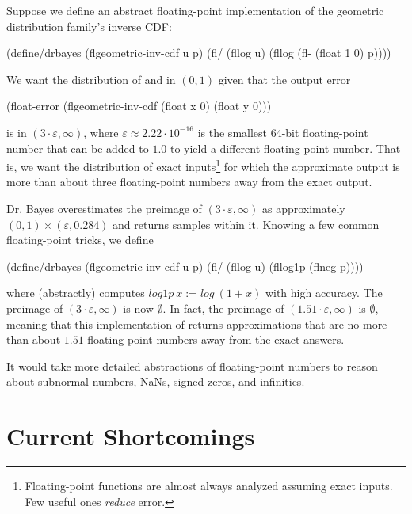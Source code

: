 Suppose we define an abstract floating-point implementation of the geometric distribution family's inverse CDF:
\begin{center}\singlespacing
\begin{schemedisplay}
(define/drbayes (flgeometric-inv-cdf u p)
  (fl/ (fllog u) (fllog (fl- (float 1 0) p))))
\end{schemedisplay}
\end{center}
We want the distribution of  and  in $(0,1)$ given that the output error
\begin{center}
\begin{schemedisplay}
(float-error (flgeometric-inv-cdf (float x 0) (float y 0)))
\end{schemedisplay}
\end{center}
is in $(3 \cdot \varepsilon,\infty)$, where $\varepsilon \approx 2.22\cdot 10^{-16}$ is the smallest 64-bit floating-point number that can be added to $1.0$ to yield a different floating-point number.
That is, we want the distribution of exact inputs\footnote{Floating-point functions are almost always analyzed assuming exact inputs. Few useful ones \emph{reduce} error.} for which the approximate output is more than about three floating-point numbers away from the exact output.

Dr. Bayes overestimates the preimage of $(3 \cdot \varepsilon,\infty)$ as approximately $(0,1) \times (\varepsilon,0.284)$ and returns samples within it.
Knowing a few common floating-point tricks, we define
\begin{center}\singlespacing
\begin{schemedisplay}
(define/drbayes (flgeometric-inv-cdf u p)
  (fl/ (fllog u) (fllog1p (flneg p))))
\end{schemedisplay}
\end{center}
where  (abstractly) computes $log1p~x := log~(1+x)$ with high accuracy.
The preimage of $(3 \cdot \varepsilon,\infty)$ is now $\emptyset$.
In fact, the preimage of $(1.51 \cdot \varepsilon,\infty)$ is $\emptyset$, meaning that this implementation of  returns approximations that are no more than about $1.51$ floating-point numbers away from the exact answers.

It would take more detailed abstractions of floating-point numbers to reason about subnormal numbers, NaNs, signed zeros, and infinities.


\section{Current Shortcomings}

